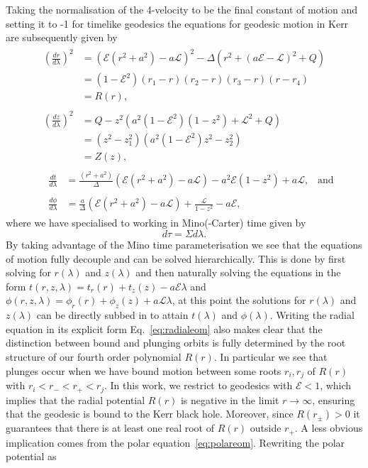 \documentclass[12pt, amsmath]{revtex4-2}
\newcommand\lam{\lambda}
\newcommand\EN{\mathcal{E}}
\newcommand\ANG{\mathcal{L}}
\begin{document}
Taking the normalisation of the 4-velocity to be the final constant of motion and setting it to -1 for timelike geodesics the equations for geodesic motion in Kerr are subsequently given by \cite{Carter:1968rr}
\begin{align}
    &\begin{aligned}\label{eq:radialeom}
        \left(\frac{dr}{d\lambda}\right)^2 
        &= (\mathcal{E}(r^2+a^2)-a\mathcal{L})^2-\Delta(r^2+(a\mathcal{E}-\mathcal{L})^2+Q)\\
        &= (1-\EN^2)(r_1-r)(r_2-r)(r_3-r)(r-r_4) \\
        &= R(r), 
    \end{aligned}\\
    &\begin{aligned}\label{eq:polareom}
        \left(\frac{dz}{d\lambda}\right)^2 &= Q-z^2(a^2(1-\EN^2)(1-z^2) + \mathcal{L}^2+Q)\\
        &= (z^2-z_1^2)(a^2(1-\EN^2) z^2-z_2^2)\\
        &= Z(z),
    \end{aligned}\\
    &\;\;\begin{aligned}\label{eq:timeeom}
        \frac{dt}{d\lambda} &= \frac{(r^2+a^2)}{\Delta}(\mathcal{E}(r^2+a^2)-a\mathcal{L})-a^2\mathcal{E}(1-z^2)+a\mathcal{L},\;\;\; \text{and}
    \end{aligned}\\
    &\;\;\begin{aligned}\label{eq:azimuthaleom}
        \frac{d\phi}{d\lambda} &= \frac{a}{\Delta}(\mathcal{E}(r^2+a^2)-a\mathcal{L})+\frac{\mathcal{L}}{1-z^2}-a\mathcal{E},
    \end{aligned}
\end{align}
where we have specialised to working in Mino(-Carter) \cite{Mino:2003yg} time given by 
\begin{equation}
    d\tau = \Sigma d\lam.
\end{equation}
By taking advantage of the Mino time parameterisation we see that the equations of motion fully decouple and can be solved hierarchically. This is done by first solving for $r(\lam)$ and $z(\lam)$ and then naturally solving the equations in the form $t(r,z,\lam) = t_r(r)+t_{z}(z) - a \EN \lam$ and $\phi(r,z,\lam) = \phi_r(r)+\phi_{z}(z) + a\ANG\lam $, at this point the solutions for $r(\lam)$ and $z(\lam)$ can be directly subbed in to attain $t(\lam)$ and $\phi(\lam)$. Writing the radial equation in its explicit form Eq.~\eqref{eq:radialeom} also makes clear that the  distinction between bound and plunging orbits is fully determined by the root structure of our fourth order polynomial $R(r)$. In particular we see that plunges occur when we have bound motion between some roots $r_i,r_j$ of $R(r)$ with $r_i<r_{-} < r_{+} < r_j$. In this work, we restrict to geodesics with $\EN<1$, which implies that the radial potential $R(r)$ is negative in the limit $r\to\infty$, ensuring that the geodesic is bound to the Kerr black hole. Moreover, since $R(r_{\pm})>0$ it guarantees that there is at least one real root of $R(r)$ outside $r_+$. A less obvious implication comes from the polar equation~\eqref{eq:polareom}. Rewriting the polar potential as
\end{document}
